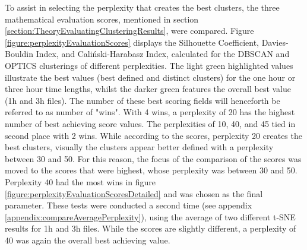 To assist in selecting the perplexity that creates the best clusters, the three mathematical evaluation scores, mentioned in section \ref{section:TheoryEvaluatingClusteringResults}, were compared. Figure \ref{figure:perplexityEvaluationScores} displays the Silhouette Coefficient, Davies-Bouldin Index, and Caliński-Harabasz Index, calculated for the DBSCAN and OPTICS clusterings of different perplexities. The light green highlighted values illustrate the best values (best defined and distinct clusters) for the one hour or three hour time lengths, whilst the darker green features the overall best value (1h and 3h files). The number of these best scoring fields will henceforth be referred to as number of "wins". With 4 wins, a perplexity of 20 has the highest number of best achieving score values. The perplexities of 10, 40, and 45 tied in second place with 2 wins. While according to the scores, perplexity 20 creates the best clusters, visually the clusters appear better defined with a perplexity between 30 and 50.  For this reason, the focus of the comparison of the scores was moved to the scores that were highest, whose perplexity was between 30 and 50. Perplexity 40 had the most wins in figure \ref{figure:perplexityEvaluationScoresDetailed} and was chosen as the final parameter. These tests were conducted a second time (see appendix \ref{appendix:compareAveragePerplexity}), using the average of two different t-SNE results for 1h and 3h files. While the scores are slightly different, a perplexity of 40 was again the overall best achieving value.




